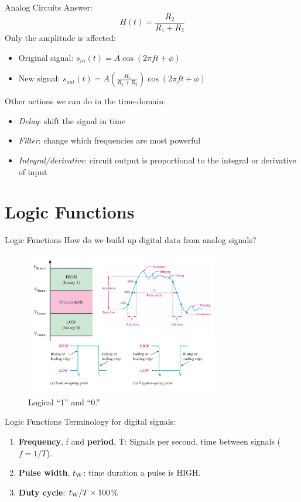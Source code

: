 \documentclass{beamer}
\begin{document}
\begin{frame}{Analog Circuits}
Answer:
\begin{equation}
H(t) = \frac{R_2}{R_1+R_2}
\end{equation}
Only the amplitude is affected:
\begin{itemize}
\item Original signal: $s_{in}(t) = A\cos(2\pi f t + \phi)$
\item New signal: $s_{out}(t) = A \left( \frac{R_1}{R_1+R_2}\right) \cos(2\pi f t + \phi)$
\end{itemize}
Other actions we can do in the time-domain:
\begin{itemize}
\item \textit{Delay}: shift the signal in time
\item \textit{Filter}: change which frequencies are most powerful
\item \textit{Integral/derivative}: circuit output is proportional to the integral or derivative of input
\end{itemize}
\end{frame}

\section{Logic Functions}

\begin{frame}{Logic Functions}
How do we build up digital data from analog signals?
\begin{figure}
\includegraphics[width=0.75\textwidth]{digital1.pdf}
\caption{\label{fig:digital1} Logical ``1'' and ``0.''}
\end{figure}
\end{frame}

\begin{frame}{Logic Functions}
Terminology for digital signals:
\begin{enumerate}
\item \textbf{Frequency}, f and \textbf{period}, T: Signals per second, time between signals ($f = 1/T$).
\item \textbf{Pulse width}, $t_{\rm W}$: time duration a pulse is HIGH.
\item \textbf{Duty cycle}: $t_{\rm W}/T \times 100$\%
\end{enumerate}
\end{frame}
\end{document}
